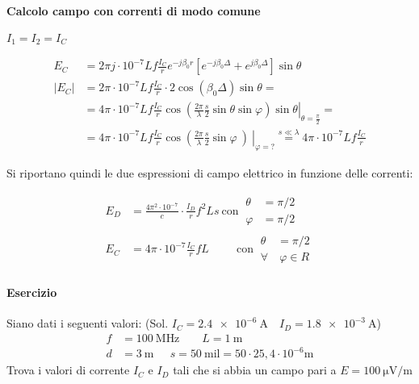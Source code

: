 
\paragraph{Calcolo campo con correnti di modo comune}
$I_1 = I_2 = I_C$

\begin{equation*}
\begin{split}
E_C & = 2 \pi j \cdot 10^{-7} L f \frac{I_C}{r}e^{-j \beta_0 r} \left[e^{-j \beta_0 \Delta} + e^{j \beta_0 \Delta} \right]\sin\theta \\
\left|E_C\right| & = 2 \pi \cdot 10^{-7} L f \frac{I_C}{r} \cdot 2 \cos(\beta_0\Delta)\sin\theta = \\
& = 4\pi\cdot10^{-7}Lf \frac{I_C}{r}\cos\left.\left(\frac{2\pi}{\lambda}\frac{s}{2}\sin\theta\sin\varphi\right)\sin\theta\right|_{\theta=\frac{\pi}{2}} =\\
& = 4\pi\cdot10^{-7}Lf\frac{I_C}{r}\cos\left.\left(\frac{2\pi}{\lambda}\frac{s}{2} \sin\varphi\ \right)\ \right|_{\varphi=?} \stackrel{s\ll\lambda}{=} 4\pi\cdot10^{-7}Lf\frac{I_C}{r}
\end{split}
\end{equation*}

Si riportano quindi le due espressioni di campo elettrico in funzione delle correnti:

\begin{equation*}
 \begin{split}
 E_D & = \frac{4\pi^2\cdot10^{-7}}{c}\cdot \frac{I_D}{r} f^2 Ls\ \text{con}\ \begin{split}
 \theta & = \pi/2 \\
 \varphi & = \pi/2
 \end{split}\\
 E_C & = 4\pi\cdot10^{-7}\frac{I_C}{r}fL\qquad\ \ \text{con}\ \begin{split}
  \theta & = \pi/2 \\
 \forall& \ \varphi\in R
 \end{split}
 \end{split}
\end{equation*}

\paragraph{Esercizio}
Siano dati i seguenti valori: (Sol. $I_C = \SI{2.4e-6}{\ampere}\quad I_D = \SI{1.8e-3}{\ampere}$)
\begin{equation*}
 \begin{split}
 f & = \SI{100}{\mega\hertz} \qquad L = \SI{1}{\meter} \\
 d & = \SI{3}{\meter}\quad \ \ s = 50\ \text{mil} = 50\cdot 25,4\cdot10^{-6} \si{\meter}
 \end{split}
\end{equation*}
Trova i valori di corrente $I_C$ e $I_D$ tali che si abbia un campo pari a $E = \SI[per-mode=symbol]{100}{\micro\volt\per\meter}$

